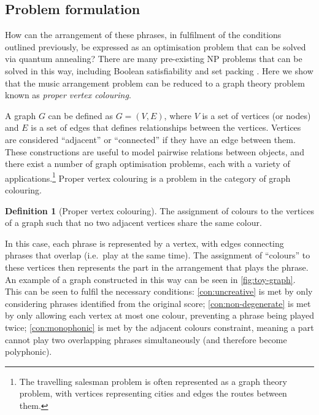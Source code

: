 \documentclass[twocolumn]{article}
\theoremstyle{definition}
\newtheorem*{definition}{Definition}
\begin{document}
\subsection*{Problem formulation}

How can the arrangement of these phrases, in fulfilment of the conditions outlined previously, be expressed as an optimisation problem that can be solved via quantum annealing? There are many pre-existing NP problems that can be solved in this way, including Boolean satisfiability and set packing \cite{lucas_ising_2014}. Here we show that the music arrangement problem can be reduced to a graph theory problem known as \emph{proper vertex colouring}.

A graph $G$ can be defined as $G=(V,E)$, where $V$ is a set of vertices (or nodes) and $E$ is a set of edges that defines relationships between the vertices. Vertices are considered ``adjacent'' or ``connected'' if they have an edge between them. These constructions are useful to model pairwise relations between objects, and there exist a number of graph optimisation problems, each with a variety of applications.\footnote{The travelling salesman problem is often represented as a graph theory problem, with vertices representing cities and edges the routes between them.} Proper vertex colouring is a problem in the category of graph colouring.

\begin{definition}[Proper vertex colouring]
    The assignment of colours to the vertices of a graph such that no two adjacent vertices share the same colour.
\end{definition}

In this case, each phrase is represented by a vertex, with edges connecting phrases that overlap (i.e.\ play at the same time). The assignment of ``colours'' to these vertices then represents the part in the arrangement that plays the phrase. An example of a graph constructed in this way can be seen in \cref{fig:toy-graph}. This can be seen to fulfil the necessary conditions: \cref{con:uncreative} is met by only considering phrases identified from the original score; \cref{con:non-degenerate} is met by only allowing each vertex at most one colour, preventing a phrase being played twice; \cref{con:monophonic} is met by the adjacent colours constraint, meaning a part cannot play two overlapping phrases simultaneously (and therefore become polyphonic). 
\end{document}
